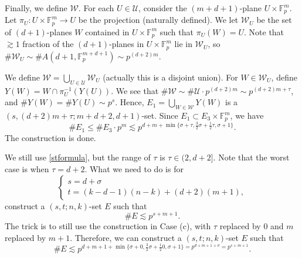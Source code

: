 \documentclass[10pt]{article}
\newcommand{\cU}{\mathcal{U}}
\newcommand{\cW}{\mathcal{W}}
\newcommand{\Fp}{\mathbb{F}_p}
\newcommand{\si}{\sigma}
\begin{document}
Finally, we define $\cW$. For each $U\in \cU$, consider the $(m+d+1)$-plane $U\times \Fp^m$.
Let $\pi_U:U\times \Fp^m\rightarrow U$ be the projection (naturally defined). We let $\cW_U$ be the set of $(d+1)$-planes $W$ contained in $U\times \Fp^m$ such that $\pi_U(W)=U$. Note that $\gtrsim 1$ fraction of the $(d+1)$-planes in  $U\times \Fp^m$ lie in $\cW_U$, so $\#\cW_U\sim \#A(d+1,\Fp^{m+d+1})\sim p^{(d+2)m}$.

We define $\cW=\bigcup_{U\in \cU}\cW_U$ (actually this is a disjoint union). For $W\in \cW_U$, define $Y(W)=W\cap \pi_U^{-1}(Y(U))$. We see that $\#\cW\sim \#\cU\cdot p^{(d+2)m}\sim p^{(d+2)m+\tau}$, and $\#Y(W)=\#Y(U)\sim p^s$. Hence, $E_1=\bigcup_{W\in\cW}Y(W)$ is a $(s,(d+2)m+\tau;m+d+2,d+1)$-set. Since $E_1\subset E_3\times \Fp^m$, we have
\[ \#E_1\le \#E_3\cdot p^m\lesssim p^{d+m+\min\{\si+\tau,\frac32\si+\frac12\tau,\si+1\}}. \]
The construction is done.

\bigskip
{}

We still use \eqref{stformula}, but the range of $\tau$ is $\tau\in(2,d+2]$. Note that the worst case is when $\tau=d+2$.
What we need to do is for
\begin{equation}
    \begin{cases}
        s=d+\si\\
        t=(k-d-1)(n-k)+(d+2)(m+1),
    \end{cases}
\end{equation} 
construct a $(s,t;n,k)$-set $E$ such that
\[ \#E\lesssim p^{s+m+1}. \]
The trick is to still use the construction in Case (c), with $\tau$ replaced by $0$ and $m$ replaced by $m+1$. Therefore, we can construct a $(s,t;n,k)$-set $E$ such that
\[\#E\lesssim p^{d+m+1+\min\{\si+0,\frac32\si+\frac120,\si+1\}=p^{d+m+1+\si}=p^{s+m+1}}. \]
\
\clearpage
\end{document}
